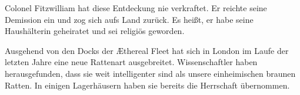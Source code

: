 \bigpar

Colonel Fitzwilliam hat diese Entdeckung nie verkraftet. Er reichte
seine Demission ein und zog sich aufs Land zurück. Es heißt, er
habe seine Haushälterin geheiratet und sei religiös geworden.

\bigpar

Ausgehend von den Docks der Æthereal Fleet hat sich in London im
Laufe der letzten Jahre eine neue Rattenart ausgebreitet.
Wissenschaftler haben herausgefunden, dass sie weit intelligenter
sind als unsere einheimischen braunen Ratten. In einigen
Lagerhäusern haben sie bereits die Herrschaft übernommen.



